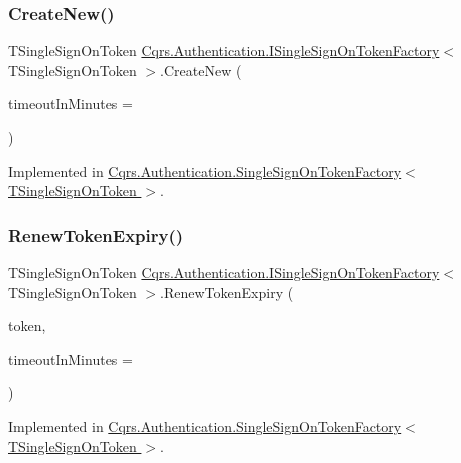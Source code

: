 \subsubsection{\texorpdfstring{Create\+New()}{CreateNew()}}
{\footnotesize\ttfamily T\+Single\+Sign\+On\+Token \hyperlink{interfaceCqrs_1_1Authentication_1_1ISingleSignOnTokenFactory}{Cqrs.\+Authentication.\+I\+Single\+Sign\+On\+Token\+Factory}$<$ T\+Single\+Sign\+On\+Token $>$.Create\+New (\begin{DoxyParamCaption}\item[{int}]{timeout\+In\+Minutes = {} }\end{DoxyParamCaption})}



Implemented in \hyperlink{classCqrs_1_1Authentication_1_1SingleSignOnTokenFactory_ab4d01a3600dbe9aa358cd93c98ccf281}{Cqrs.\+Authentication.\+Single\+Sign\+On\+Token\+Factory$<$ T\+Single\+Sign\+On\+Token $>$}.

\mbox{\label{interfaceCqrs_1_1Authentication_1_1ISingleSignOnTokenFactory_ab436004ad1631140f7a58927cbacd8c4}} 
\subsubsection{\texorpdfstring{Renew\+Token\+Expiry()}{RenewTokenExpiry()}}
{\footnotesize\ttfamily T\+Single\+Sign\+On\+Token \hyperlink{interfaceCqrs_1_1Authentication_1_1ISingleSignOnTokenFactory}{Cqrs.\+Authentication.\+I\+Single\+Sign\+On\+Token\+Factory}$<$ T\+Single\+Sign\+On\+Token $>$.Renew\+Token\+Expiry (\begin{DoxyParamCaption}\item[{T\+Single\+Sign\+On\+Token}]{token,  }\item[{int}]{timeout\+In\+Minutes = {} }\end{DoxyParamCaption})}



Implemented in \hyperlink{classCqrs_1_1Authentication_1_1SingleSignOnTokenFactory_a699ceac65874b8319d2e26fa88f554be}{Cqrs.\+Authentication.\+Single\+Sign\+On\+Token\+Factory$<$ T\+Single\+Sign\+On\+Token $>$}.

